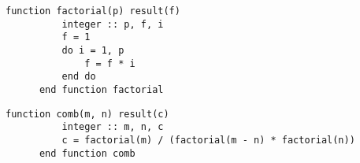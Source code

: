 \documentclass[10pt]{beamer}
\begin{document}
  \begin{frame}[fragile]
    \begin{lstlisting}[gobble=6,frame=single]
      function factorial(p) result(f)
          integer :: p, f, i
          f = 1
          do i = 1, p
              f = f * i
          end do
      end function factorial
    \end{lstlisting}
    \pause
    \begin{lstlisting}[gobble=6,frame=single]
      function comb(m, n) result(c)
          integer :: m, n, c
          c = factorial(m) / (factorial(m - n) * factorial(n))
      end function comb
    \end{lstlisting}
    
\end{frame}

  \begin{frame}
    
  \end{frame}
\end{document}
